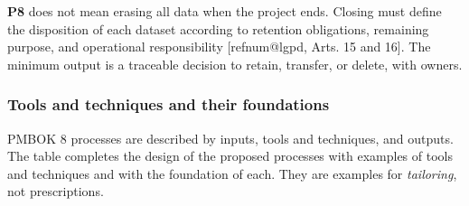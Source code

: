 \documentclass[11pt,a4paper]{article}
\makeatletter
\newcommand{\refnum}[1]{\csname refnum@#1\endcsname}
\makeatother
\begin{document}
\textbf{P8} does not mean erasing all data when the project ends. Closing must define the disposition of each dataset according to retention obligations, remaining purpose, and operational responsibility [\refnum{lgpd}, Arts. 15 and 16]. The minimum output is a traceable decision to retain, transfer, or delete, with owners.
\subsubsection{Tools and techniques and their foundations}

PMBOK 8 processes are described by inputs, tools and techniques, and outputs. The table completes the design of the proposed processes with examples of tools and techniques and with the foundation of each. They are examples for \textit{tailoring}, not prescriptions.
\end{document}
